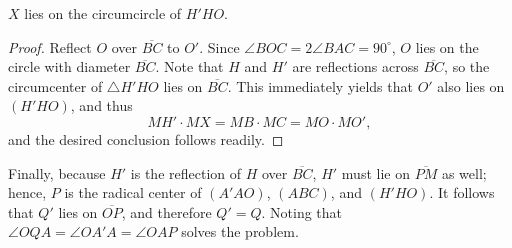 \begin{iclaim}
    $X$ lies on the circumcircle of $H'HO$.
\end{iclaim}
\begin{proof}
    Reflect $O$ over $\overline{BC}$ to $O'$. Since $\angle BOC=2\angle BAC=90^\circ$, $O$ lies on the circle with diameter $\overline{BC}$. Note that $H$ and $H'$ are reflections across $\overline{BC}$, so the circumcenter of $\triangle H'HO$ lies on $\overline{BC}$. This immediately yields that $O'$ also lies on $(H'HO)$, and thus \[MH'\cdot MX=MB\cdot MC=MO\cdot MO',\]
    and the desired conclusion follows readily.
\end{proof}

Finally, because $H'$ is the reflection of $H$ over $\overline{BC}$, $H'$ must lie on $\overline{PM}$ as well; hence, $P$ is the radical center of $(A'AO)$, $(ABC)$, and $(H'HO)$. It follows that $Q'$ lies on $\overline{OP}$, and therefore $Q'=Q$. Noting that
$\angle OQA=\angle OA'A=\angle OAP$ solves the problem.

